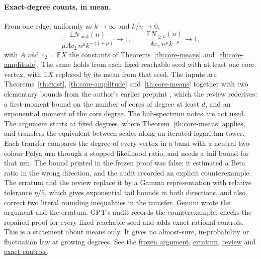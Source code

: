 \documentclass[11pt]{article}
\newcommand{\ordersrc}[2]{\href{https://github.com/uzay-eth/friend-tree-exponent/blob/62081cad01112c42c2011ac3eed11aa3aa665e09/#1}{#2}}
\theoremstyle{remark}
\numberwithin{equation}{section}
\newcommand{\E}{\mathbb E}
\begin{document}
\paragraph{Exact-degree counts, in mean.} From one edge, uniformly as $k\to\infty$ and $k/n\to0$,
\[
 \frac{\E N_{=k}(n)}{\mu A c_2\,n^\mu k^{-(1+\mu)}}\longrightarrow1,
 \qquad
 \frac{\E N_{\ge k}(n)}{A c_2\,n^\mu k^{-\mu}}\longrightarrow1,
\]
with $A$ and $c_2=\E X$ the constants of Theorems~\ref{th:core-means} and~\ref{th:core-amplitude}. The same holds from each fixed reachable seed with at least one core vertex, with $\E X$ replaced by its mean from that seed. The inputs are Theorems~\ref{th:exist}, \ref{th:core-amplitude} and~\ref{th:core-means} together with two elementary bounds from the author's earlier preprint \cite{UzayFirst}, which the review rederives: a first-moment bound on the number of cores of degree at least $d$, and an exponential moment of the core degree. The hub-spectrum notes are not used. The argument starts at fixed degrees, where Theorem~\ref{th:core-means} applies, and transfers the equivalent between scales along an iterated-logarithm tower. Each transfer compares the degree of every vertex in a band with a neutral two-colour P\'olya urn through a stopped likelihood ratio, and needs a tail bound for that urn. The bound printed in the frozen proof was false: it estimated a Beta ratio in the wrong direction, and the audit recorded an explicit counterexample. The erratum and the review replace it by a Gamma representation with relative tolerance $\eta/5$, which gives exponential tail bounds in both directions, and also correct two literal rounding inequalities in the transfer. Gemini wrote the argument and the erratum. GPT's audit records the counterexample, checks the repaired proof for every fixed reachable seed and adds exact rational controls. This is a statement about means only. It gives no almost-sure, in-probability or fluctuation law at growing degrees. See the \ordersrc{round3/q2-growing-degrees/CONTINUATION_DISCRETE_MEAN.md}{frozen argument}, \ordersrc{round3/q2-growing-degrees/ERRATUM_DISCRETE_MEAN.md}{erratum}, \ordersrc{round3/q2-growing-degrees/REVIEW.md}{review} and \ordersrc{round3/q2-growing-degrees/audit_exact.py}{exact controls}.
\end{document}
